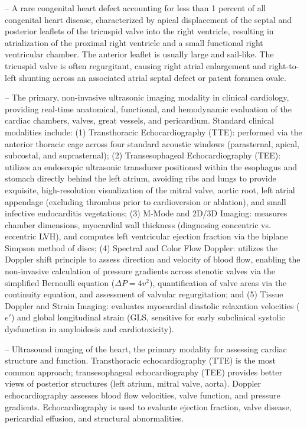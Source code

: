 -- A rare congenital heart defect accounting for less than 1 percent of all congenital heart disease, characterized by apical displacement of the septal and posterior leaflets of the tricuspid valve into the right ventricle, resulting in atrialization of the proximal right ventricle and a small functional right ventricular chamber. The anterior leaflet is usually large and sail-like. The tricuspid valve is often regurgitant, causing right atrial enlargement and right-to-left shunting across an associated atrial septal defect or patent foramen ovale.

-- The primary, non-invasive ultrasonic imaging modality in clinical cardiology, providing real-time anatomical, functional, and hemodynamic evaluation of the cardiac chambers, valves, great vessels, and pericardium. Standard clinical modalities include: (1) Transthoracic Echocardiography (TTE): performed via the anterior thoracic cage across four standard acoustic windows (parasternal, apical, subcostal, and suprasternal); (2) Transesophageal Echocardiography (TEE): utilizes an endoscopic ultrasonic transducer positioned within the esophagus and stomach directly behind the left atrium, avoiding ribs and lungs to provide exquisite, high-resolution visualization of the mitral valve, aortic root, left atrial appendage (excluding thrombus prior to cardioversion or ablation), and small infective endocarditis vegetations; (3) M-Mode and 2D/3D Imaging: measures chamber dimensions, myocardial wall thickness (diagnosing concentric vs. eccentric LVH), and computes left ventricular ejection fraction via the biplane Simpson method of discs; (4) Spectral and Color Flow Doppler: utilizes the Doppler shift principle to assess direction and velocity of blood flow, enabling the non-invasive calculation of pressure gradients across stenotic valves via the simplified Bernoulli equation ($\Delta P = 4v^2$), quantification of valve areas via the continuity equation, and assessment of valvular regurgitation; and (5) Tissue Doppler and Strain Imaging: evaluates myocardial diastolic relaxation velocities ($e'$) and global longitudinal strain (GLS, sensitive for early subclinical systolic dysfunction in amyloidosis and cardiotoxicity).

-- Ultrasound imaging of the heart, the primary modality for assessing cardiac structure and function. Transthoracic echocardiography (TTE) is the most common approach; transesophageal echocardiography (TEE) provides better views of posterior structures (left atrium, mitral valve, aorta). Doppler echocardiography assesses blood flow velocities, valve function, and pressure gradients. Echocardiography is used to evaluate ejection fraction, valve disease, pericardial effusion, and structural abnormalities.

